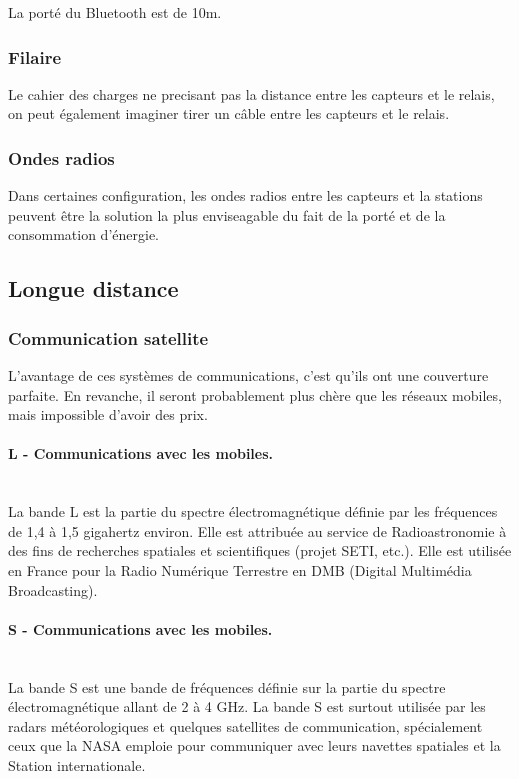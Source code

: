             La porté du Bluetooth est de 10m.
            
        \subsubsection{Filaire}
            Le cahier des charges ne precisant pas la distance entre les capteurs et le relais, on peut également imaginer tirer un câble entre les capteurs et le relais.
            
        \subsubsection{Ondes radios}
            Dans certaines configuration, les ondes radios entre les capteurs et la stations peuvent être la solution la plus enviseagable du fait de la porté et de la consommation d'énergie.
            

\subsection{Longue distance}

    \subsubsection{Communication satellite}

        L'avantage de ces systèmes de communications, c'est qu'ils ont une couverture parfaite.
        En revanche, il seront probablement plus chère que les réseaux mobiles, mais impossible d'avoir des prix.

        \paragraph{L - Communications avec les mobiles.}\\
            La bande L est la partie du spectre électromagnétique définie par les fréquences de 1,4 à 1,5 gigahertz environ. Elle est attribuée au service de Radioastronomie à des fins de recherches spatiales et scientifiques (projet SETI, etc.). Elle est utilisée en France pour la Radio Numérique Terrestre en DMB (Digital Multimédia Broadcasting).

        \paragraph{S - Communications avec les mobiles.}\\
            La bande S est une bande de fréquences définie sur la partie du spectre électromagnétique allant de 2 à 4 GHz.
            La bande S est surtout utilisée par les radars météorologiques et quelques satellites de communication, spécialement ceux que la NASA emploie pour communiquer avec leurs navettes spatiales et la Station internationale.

